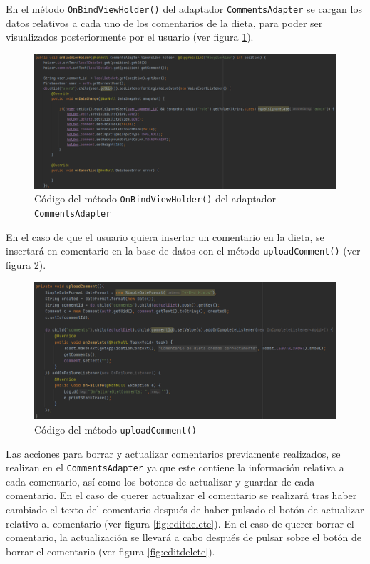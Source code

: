 En el método \texttt{OnBindViewHolder()} del adaptador \texttt{CommentsAdapter} se cargan los datos relativos a cada uno de los comentarios de la dieta, para poder ser visualizados posteriormente por el usuario (ver figura \ref{fig:commentsadapter}).

\begin{figure}[H]
    \centering
    \includegraphics[width=\textwidth]{Images/Capitulo7/commentsadapter.png}
    \caption{Código del método \texttt{OnBindViewHolder()} del adaptador \texttt{CommentsAdapter}}
    \label{fig:commentsadapter}
\end{figure}

En el caso de que el usuario quiera insertar un comentario en la dieta, se insertará en comentario en la base de datos con el método \texttt{uploadComment()} (ver figura \ref{fig:upload_comment_method}).
\begin{figure}[H]
    \centering
    \includegraphics[width=\textwidth]{Images/Capitulo7/uploadcomment.png}
    \caption{Código del método \texttt{uploadComment()}}
    \label{fig:upload_comment_method}
\end{figure}

Las acciones para borrar y actualizar comentarios previamente realizados, se realizan en el \texttt{CommentsAdapter} ya que este contiene la información relativa a cada comentario, así como los botones de actualizar y guardar de cada comentario.
En el caso de querer actualizar el comentario se realizará tras haber cambiado el texto del comentario después de haber pulsado el botón de actualizar relativo al comentario (ver figura \ref{fig:editdelete}).
En el caso de querer borrar el comentario, la actualización se llevará a cabo después de pulsar sobre el botón de borrar el comentario (ver figura \ref{fig:editdelete}).

